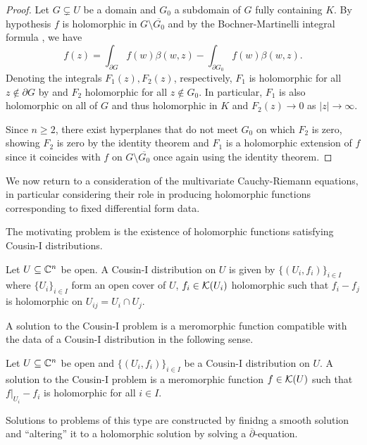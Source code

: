 \begin{proof}
    Let $G\subsetneq U$ be a domain and $G_{0}$ a subdomain of $G$ fully containing $K$. By hypothesis $f$ is holomorphic in $G\setminus\overline{G_{0}}$ and by the Bochner-Martinelli integral formula , we have 
    $$f(z)=\int_{\partial G}f(w)\beta(w,z)-\int_{\partial G_{0}}f(w)\beta(w,z).$$
    Denoting the integrals $F_{1}(z),F_{2}(z)$, respectively, $F_{1}$ is holomorphic for all $z\notin\partial G$ by  and $F_{2}$ holomorphic for all $z\notin G_{0}$. In particular, $F_{1}$ is also holomorphic on all of $G$ and thus holomorphic in $K$ and $F_{2}(z)\to0$ as $|z|\to\infty$. 

    Since $n\geq 2$, there exist hyperplanes that do not meet $G_{0}$ on which $F_{2}$ is zero, showing $F_{2}$ is zero by the identity theorem  and $F_{1}$ is a holomorphic extension of $f$ since it coincides with $f$ on $G\setminus\overline{G_{0}}$ once again using the identity theorem. 
\end{proof}

We now return to a consideration of the multivariate Cauchy-Riemann equations, in particular considering their role in producing holomorphic functions corresponding to fixed differential form data. 

The motivating problem is the existence of holomorphic functions satisfying Cousin-I distributions. 
\begin{definition}\label{def: Cousin-I distribution}
    Let $U\subseteq\mathbb{C}^{n}$ be open. A Cousin-I distribution on $U$ is given by $\{(U_{i},f_{i})\}_{i\in I}$ where $\{U_{i}\}_{i\in I}$ form an open cover of $U$, $f_{i}\in\mathcal{K}(U_{i})$ holomorphic such that $f_{i}-f_{j}$ is holomorphic on $U_{ij}=U_{i}\cap U_{j}$.
\end{definition}
A solution to the Cousin-I problem is a meromorphic function compatible with the data of a Cousin-I distribution in the following sense. 
\begin{definition}
    Let $U\subseteq\mathbb{C}^{n}$ be open and $\{(U_{i},f_{i})\}_{i\in I}$ be a Cousin-I distribution on $U$. A solution to the Cousin-I problem is a meromorphic function $f\in\mathcal{K}(U)$ such that $f|_{U_{i}}-f_{i}$ is holomorphic for all $i\in I$. 
\end{definition}
Solutions to problems of this type are constructed by finidng a smooth solution and ``altering'' it to a holomorphic solution by solving a $\overline{\partial}$-equation.

